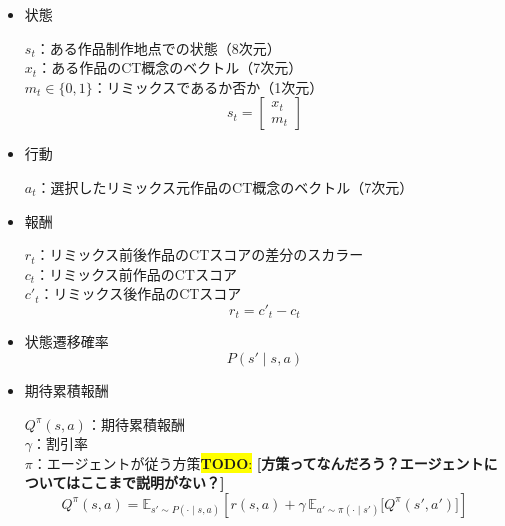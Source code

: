 \documentclass[submit,techrep,noauthor]{ipsj}
\newcommand{\todo}[1]{\colorbox{yellow}{{\bf TODO}:}{\color{red} {\textbf{[#1]}}}}
\begin{document}
\begin{itemize}
    \item 状態
        
        $s_t$：ある作品制作地点での状態（8次元）\\
        $x_t$：ある作品のCT概念のベクトル（7次元）\\
        $m_t\in\{0,1\}$：リミックスであるか否か（1次元）
        \begin{equation}
            s_t = 
            \begin{bmatrix}
               x_t \\
               m_t 
            \end{bmatrix}
        \end{equation}

    \item 行動

        $a_t$：選択したリミックス元作品のCT概念のベクトル（7次元）

    \item 報酬
    
        $r_t$：リミックス前後作品のCTスコアの差分のスカラー\\
        $c_t$：リミックス前作品のCTスコア\\
        $c'_t$：リミックス後作品のCTスコア
        \begin{equation}
            r_t = c'_t - c_t
        \end{equation}
    
    \item 状態遷移確率
        \begin{equation}
            P(s' \mid s, a)
        \end{equation}

    \item 期待累積報酬

        $Q^{\pi}(s, a)$：期待累積報酬\\
        $\gamma$：割引率\\        
        $\pi$：エージェントが従う方策\todo{方策ってなんだろう？エージェントについてはここまで説明がない？}
        \begin{equation}
            Q^{\pi}(s, a) = \mathbb{E}_{s' \sim P(\cdot \mid s, a)} 
            \left[ r(s, a) + \gamma \, 
            \mathbb{E}_{a' \sim \pi(\cdot \mid s')} 
            \big[ Q^{\pi}(s', a') \big] \right]
        \end{equation}

\end{itemize}
\end{document}

